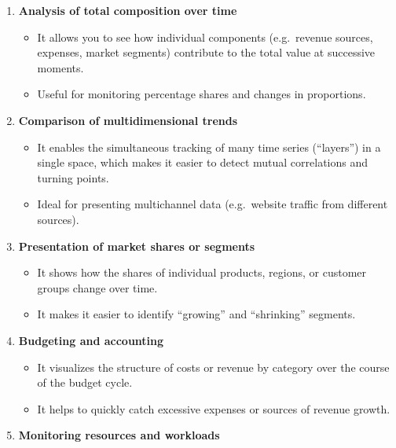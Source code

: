 \documentclass[
  english,
  letterpaper,
  DIV=11,
  numbers=noendperiod]{scrreprt}
\providecommand{\tightlist}{%
  \setlength{\itemsep}{0pt}\setlength{\parskip}{0pt}}
\begin{document}
\begin{enumerate}
\def\labelenumi{\arabic{enumi}.}
\tightlist
\item
  \textbf{Analysis of total composition over time}

  \begin{itemize}
  \tightlist
  \item
    It allows you to see how individual components (e.g.~revenue
    sources, expenses, market segments) contribute to the total value at
    successive moments.\\
  \item
    Useful for monitoring percentage shares and changes in proportions.
  \end{itemize}
\item
  \textbf{Comparison of multidimensional trends}

  \begin{itemize}
  \tightlist
  \item
    It enables the simultaneous tracking of many time series
    (``layers'') in a single space, which makes it easier to detect
    mutual correlations and turning points.\\
  \item
    Ideal for presenting multichannel data (e.g.~website traffic from
    different sources).
  \end{itemize}
\item
  \textbf{Presentation of market shares or segments}

  \begin{itemize}
  \tightlist
  \item
    It shows how the shares of individual products, regions, or customer
    groups change over time.\\
  \item
    It makes it easier to identify ``growing'' and ``shrinking''
    segments.
  \end{itemize}
\item
  \textbf{Budgeting and accounting}

  \begin{itemize}
  \tightlist
  \item
    It visualizes the structure of costs or revenue by category over the
    course of the budget cycle.\\
  \item
    It helps to quickly catch excessive expenses or sources of revenue
    growth.
  \end{itemize}
\item
  \textbf{Monitoring resources and workloads}


\end{enumerate}
\end{document}

